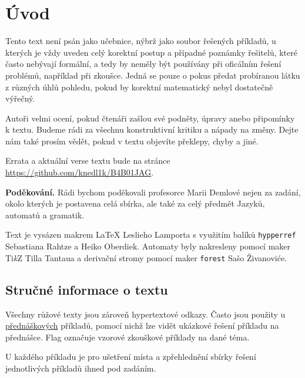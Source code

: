 \section*{Úvod}

\hspace{0.8cm} Tento text není psán jako učebnice, nýbrž jako soubor řešených příkladů, u kterých je vždy uveden celý korektní postup
a případné poznámky řešitelů, které často nebývají formální, a tedy by neměly být používány při oficálním řešení problémů, 
například při zkoušce. Jedná se pouze o pokus předat probíranou látku z různých úhlů pohledu, pokud by korektní matematický
nebyl dostatečně výřečný.

\hspace{0.8cm} Autoři velmi ocení, pokud čtenáři zašlou své podněty, úpravy anebo připomínky k textu. Budeme rádi za všechnu konstruktivní
kritiku a nápady na změny. Dejte nám také prosím vědět, pokud v textu objevíte překlepy, chyby a jiné.

Errata a aktuální verse textu bude na stránce \url{https://github.com/knedl1k/B4B01JAG}.

\textbf{Poděkování.} Rádi bychom poděkovali profesorce Marii Demlové nejen za zadání, okolo kterých je postavena celá sbírka,
ale také za celý předmět Jazyků, automatů a gramatik.

\hspace{0.8cm} Text je vysázen makrem \LaTeX{} Leslieho Lamporta s využitím balíků \texttt{hypperref} \\ 
Sebastiana Rahtze a Heiko Oberdiek. Automaty byly nakresleny pomocí maker Ti\textit{k}Z Tilla Tantaua a derivační
stromy pomocí maker \texttt{forest} Sašo Živanoviće.

\subsection*{Stručné informace o textu}
Všechny růžové texty jsou zároveň hypertextové odkazy. Často jsou použity u  
\href{https://youtube.com/playlist?list=PLQL6z4JeTTQkLuzI78OTnfYBclE1g0UjS&si=7fIuogtxj7mi1HZ-}{přednáškových} 
příkladů, pomocí nichž lze vidět ukázkové řešení příkladu na přednášce. Flag  označuje vzorové zkouškové 
příklady na dané téma. 

U každého příkladu je pro ušetření místa a zpřehlednění sbírky řešení jednotlivých příkladů ihned pod zadáním.


